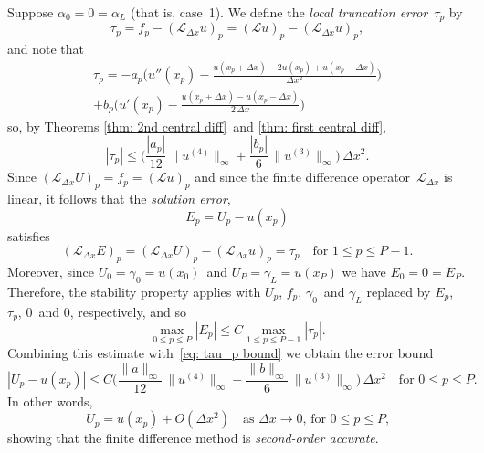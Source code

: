 Suppose $\alpha_0=0=\alpha_L$ (that is, case~1). We define the 
\emph{local truncation error}~$\tau_p$ by
\[
\tau_p=f_p-(\mathcal{L}_{\Delta x}u)_p
    =(\mathcal{L}u)_p-(\mathcal{L}_{\Delta x}u)_p,
\]
and note that
\begin{multline*}
\tau_p=-a_p\biggl(
    u''(x_p)-\frac{u(x_p+\Delta x)-2u(x_p)+u(x_p-\Delta x)}{\Delta x^2}\biggr)\\
+b_p\biggl(u'(x_p)-\frac{u(x_p+\Delta x)-u(x_p-\Delta x)}{2\,\Delta x}\biggr)
\end{multline*}
so, by Theorems \ref{thm: 2nd central diff}~and \ref{thm: first central diff},
\begin{equation}\label{eq: tau_p bound}
|\tau_p|\le\biggl(\frac{|a_p|}{12}\,\|u^{(4)}\|_\infty
    +\frac{|b_p|}{6}\,\|u^{(3)}\|_\infty\biggr)\,\Delta x^2.
\end{equation}
Since $(\mathcal{L}_{\Delta x}U)_p=f_p=(\mathcal{L}u)_p$ and since the 
finite difference operator~$\mathcal{L}_{\Delta x}$ is linear, it follows that
the \emph{solution error},
\[
E_p=U_p-u(x_p)
\]
satisfies
\[
(\mathcal{L}_{\Delta x}E)_p=(\mathcal{L}_{\Delta x}U)_p
    -(\mathcal{L}_{\Delta x}u)_p=\tau_p\quad\text{for $1\le p\le P-1$.}
\]
Moreover, since $U_0=\gamma_0=u(x_0)$~and $U_P=\gamma_L=u(x_P)$ we have 
$E_0=0=E_P$.  Therefore, the stability property applies with $U_p$, $f_p$, 
$\gamma_0$~and $\gamma_L$ replaced by $E_p$, $\tau_p$, $0$~and $0$, 
respectively, and so
\[
\max_{0\le p\le P}|E_p|\le C\max_{1\le p\le P-1}|\tau_p|.
\]
Combining this estimate with~\eqref{eq: tau_p bound} we obtain the error bound
\[
|U_p-u(x_p)|\le C \biggl(\frac{\|a\|_\infty}{12}\,\|u^{(4)}\|_\infty
    +\frac{\|b\|_\infty}{6}\,\|u^{(3)}\|_\infty\biggr)\,\Delta x^2
    \quad\text{for $0\le p\le P$.}
\]
In other words,
\[
U_p=u(x_p)+O(\Delta x^2)\quad\text{as $\Delta x\to0$, for $0\le p\le P$,}
\]
showing that the finite difference method is \emph{second-order accurate}.

